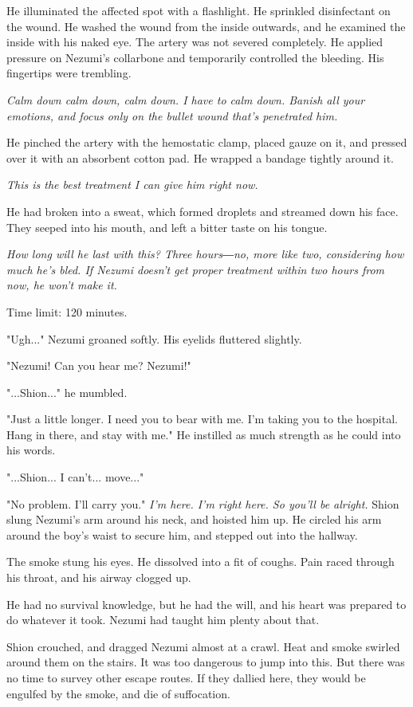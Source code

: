 He illuminated the affected spot with a flashlight. He sprinkled
disinfectant on the wound. He washed the wound from the inside outwards,
and he examined the inside with his naked eye. The artery was not
severed completely. He applied pressure on Nezumi's collarbone and
temporarily controlled the bleeding. His fingertips were trembling.

\emph{Calm down calm down, calm down. I have to calm down. Banish all your
	emotions, and focus only on the bullet wound that's penetrated him.}

He pinched the artery with the hemostatic clamp, placed gauze on it, and
pressed over it with an absorbent cotton pad. He wrapped a bandage
tightly around it.

\emph{This is the best treatment I can give him right now.}

He had broken into a sweat, which formed droplets and streamed down his
face. They seeped into his mouth, and left a bitter taste on his tongue.

\emph{How long will he last with this? Three hours―no, more like two,
	considering how much he's bled. If Nezumi doesn't get proper treatment
	within two hours from now, he won't make it.}

Time limit: 120 minutes.

"Ugh..." Nezumi groaned softly. His eyelids fluttered slightly.

"Nezumi! Can you hear me? Nezumi!"

"...Shion..." he mumbled.

"Just a little longer. I need you to bear with me. I'm taking you to the
hospital. Hang in there, and stay with me." He instilled as much
strength as he could into his words.

"...Shion... I can't... move..."

"No problem. I'll carry you." \emph{I'm here. I'm right here. So you'll be
	alright.} Shion slung Nezumi's arm around his neck, and hoisted him up.
He circled his arm around the boy's waist to secure him, and stepped out
into the hallway.

The smoke stung his eyes. He dissolved into a fit of coughs. Pain raced
through his throat, and his airway clogged up.

He had no survival knowledge, but he had the will, and his heart was
prepared to do whatever it took. Nezumi had taught him plenty about
that.

Shion crouched, and dragged Nezumi almost at a crawl. Heat and smoke
swirled around them on the stairs. It was too dangerous to jump into
this. But there was no time to survey other escape routes. If they
dallied here, they would be engulfed by the smoke, and die of
suffocation.

